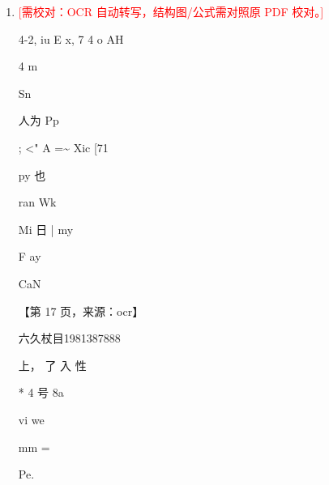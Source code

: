 \documentclass[UTF8,12pt,a4paper,openany]{ctexbook}
\newcommand{\TODO}[1]{\textcolor{red}{[需校对：#1]}}
\begin{document}
\begin{enumerate}[label=\textbf{\arabic*.},leftmargin=2em]
Ths  |  v)  mi\par Hy   Yuzyye 2\par bp\par quit Yhyxz十 PP?    ,| £\%  om\par ae ‘tt Pp   ) | ue 乌\par 外\par ia\par ]\par CaN\par \par 【第 14 页，来源：ocr】\par 未久向全1981387888\par 人\par hy  \%  ow     hy +\par Bs\par +\par AN\par Vo\par Yuya Pip =0    2   hl = «seb\par we    al 证\par 也                           2 ¢€     \_— wiz\par aN”  i  ou”       at     539818 ca\par op  v        — a so\par T mB"        中        na\par bY,\par os aa i Ba —   bx ovine\par \}              Tn   =\par 4   ie       Ll\par /   Wa   /  /|   4   =\par 8\par «nyt ?    本  Ae x 20\%   \& ee   Ww?\par ree.\par je\par 2 ed ced ca\par e      we   we\par io \%   \_ im 7\par “Spo\par \par 【第 15 页，来源：ocr】\par HEL SAR STN\par RITE OD IGBISES\par 4, Hee,\par “a din                 ot t—i,\par 7       ee\par 2    b                Fi                          241\par 到       be\par ws   aL       ic\par (oe       \{wu              8\par Yu= 至   ,人和: 下+  me  .,  zf一\par a>\par a"\par 14”\par :              yi\par SY\par W | a”\par 了\par are       Ahh, 7            Pa\par ty                        a\par an\par a\par ENO\par \par 【第 16 页，来源：ocr】\par SEAR ais\par IAMS OsIO3TE89\par 62,              x" 4     3\par EX 43\%. ahem\par nde Py = 4\par FM\par ZL      ;      \%.\par TAT\par ‘etic:\par l               c
\item \TODO{OCR 自动转写，结构图/公式需对照原 PDF 校对。}\par 4-2,      iu E       x,    7    4 o AH\par 4         m\par Sn\par 人为 Pp\par ;     <" A    =\textasciitilde{} Xic     [71\par py               也\par ran           Wk\par Mi 日   | my\par F      ay\par CaN\par \par 【第 17 页，来源：ocr】\par 六久杖目1981387888\par 上， 了 入       性\par ** 4           号 8a\par vi  we\par mm              =\par Pe.         
\end{enumerate}
\end{document}
